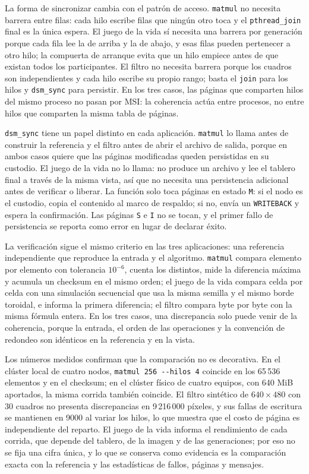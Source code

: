 La forma de sincronizar cambia con el patrón de acceso. \texttt{matmul} no necesita barrera entre filas: cada hilo escribe filas que ningún otro toca y el \texttt{pthread\_join} final es la única espera. El juego de la vida sí necesita una barrera por generación porque cada fila lee la de arriba y la de abajo, y esas filas pueden pertenecer a otro hilo; la compuerta de arranque evita que un hilo empiece antes de que existan todos los participantes. El filtro no necesita barrera porque los cuadros son independientes y cada hilo escribe su propio rango; basta el \texttt{join} para los hilos y \texttt{dsm\_sync} para persistir. En los tres casos, las páginas que comparten hilos del mismo proceso no pasan por MSI: la coherencia actúa entre procesos, no entre hilos que comparten la misma tabla de páginas.

\texttt{dsm\_sync} tiene un papel distinto en cada aplicación. \texttt{matmul} lo llama antes de construir la referencia y el filtro antes de abrir el archivo de salida, porque en ambos casos quiere que las páginas modificadas queden persistidas en su custodio. El juego de la vida no lo llama: no produce un archivo y lee el tablero final a través de la misma vista, así que no necesita una persistencia adicional antes de verificar o liberar. La función solo toca páginas en estado \texttt{M}: si el nodo es el custodio, copia el contenido al marco de respaldo; si no, envía un \texttt{WRITEBACK} y espera la confirmación. Las páginas \texttt{S} e \texttt{I} no se tocan, y el primer fallo de persistencia se reporta como error en lugar de declarar éxito.

La verificación sigue el mismo criterio en las tres aplicaciones: una referencia independiente que reproduce la entrada y el algoritmo. \texttt{matmul} compara elemento por elemento con tolerancia $10^{-6}$, cuenta los distintos, mide la diferencia máxima y acumula un checksum en el mismo orden; el juego de la vida compara celda por celda con una simulación secuencial que usa la misma semilla y el mismo borde toroidal, e informa la primera diferencia; el filtro compara byte por byte con la misma fórmula entera. En los tres casos, una discrepancia solo puede venir de la coherencia, porque la entrada, el orden de las operaciones y la convención de redondeo son idénticos en la referencia y en la vista.

Los números medidos confirman que la comparación no es decorativa. En el clúster local de cuatro nodos, \texttt{matmul 256 -{}-hilos 4} coincide en los 65\,536 elementos y en el checksum; en el clúster físico de cuatro equipos, con 640 MiB aportados, la misma corrida también coincide. El filtro sintético de $640 \times 480$ con 30 cuadros no presenta discrepancias en 9\,216\,000 píxeles, y sus fallas de escritura se mantienen en 9000 al variar los hilos, lo que muestra que el costo de página es independiente del reparto. El juego de la vida informa el rendimiento de cada corrida, que depende del tablero, de la imagen y de las generaciones; por eso no se fija una cifra única, y lo que se conserva como evidencia es la comparación exacta con la referencia y las estadísticas de fallos, páginas y mensajes.

